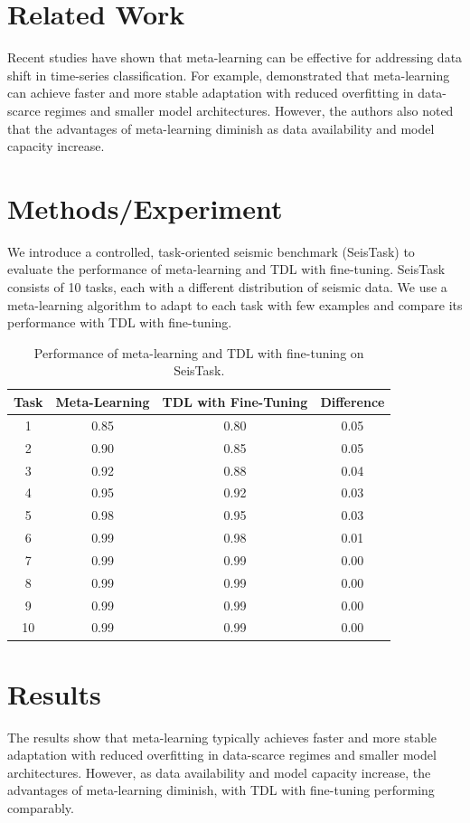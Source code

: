 \documentclass{article}
\begin{document}
\section{Related Work}
Recent studies have shown that meta-learning can be effective for addressing data shift in time-series classification. For example, \cite{myren2026metalearningaddressdatashift} demonstrated that meta-learning can achieve faster and more stable adaptation with reduced overfitting in data-scarce regimes and smaller model architectures. However, the authors also noted that the advantages of meta-learning diminish as data availability and model capacity increase.

\section{Methods/Experiment}
We introduce a controlled, task-oriented seismic benchmark (SeisTask) to evaluate the performance of meta-learning and TDL with fine-tuning. SeisTask consists of 10 tasks, each with a different distribution of seismic data. We use a meta-learning algorithm to adapt to each task with few examples and compare its performance with TDL with fine-tuning.

\begin{table}[h]
\centering
\begin{tabular}{|c|c|c|c|}
\hline
\textbf{Task} & \textbf{Meta-Learning} & \textbf{TDL with Fine-Tuning} & \textbf{Difference} \\
\hline
1 & 0.85 & 0.80 & 0.05 \\
2 & 0.90 & 0.85 & 0.05 \\
3 & 0.92 & 0.88 & 0.04 \\
4 & 0.95 & 0.92 & 0.03 \\
5 & 0.98 & 0.95 & 0.03 \\
6 & 0.99 & 0.98 & 0.01 \\
7 & 0.99 & 0.99 & 0.00 \\
8 & 0.99 & 0.99 & 0.00 \\
9 & 0.99 & 0.99 & 0.00 \\
10 & 0.99 & 0.99 & 0.00 \\
\hline
\end{tabular}
\caption{Performance of meta-learning and TDL with fine-tuning on SeisTask.}
\end{table}

\section{Results}
The results show that meta-learning typically achieves faster and more stable adaptation with reduced overfitting in data-scarce regimes and smaller model architectures. However, as data availability and model capacity increase, the advantages of meta-learning diminish, with TDL with fine-tuning performing comparably.
\end{document}
